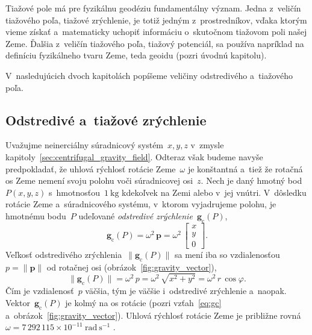 \documentclass[a4paper, 12pt]{book}
\newcommand{\cidx}{\mathrm c}
\let\vec\mathbf
\begin{document}
Tiažové pole má pre fyzikálnu geodéziu fundamentálny význam.  Jedna z~veličín 
tiažového poľa, tiažové zrýchlenie, je totiž jedným z~prostredníkov, vďaka 
ktorým vieme získať a~matematicky uchopiť informáciu o~skutočnom tiažovom poli 
našej Zeme.  Ďalšia z~veličín tiažového poľa, tiažový potenciál, sa používa 
napríklad na definíciu fyzikálneho tvaru Zeme, teda geoidu (pozri úvodnú 
kapitolu).

V~nasledujúcich dvoch kapitolách popíšeme veličiny odstredivého a~tiažového 
poľa.






\subsection{Odstredivé a~tiažové zrýchlenie}
\label{sec:centrifugal_and_gravity_acceleration}

Uvažujme neinerciálny súradnicový systém~$x, y, z$ v~zmysle 
kapitoly~\ref{sec:centrifugal_gravity_field}.  Odteraz však budeme navyše 
predpokladať, že uhlová rýchlosť rotácie Zeme~$\omega$ je konštantná a~tiež že 
rotačná os Zeme nemení svoju polohu voči súradnicovej osi~$z$.  Nech je daný 
hmotný bod~$P(x, y, z)$ s~hmotnosťou~$1\ \mathrm{kg}$ kdekoľvek na Zemi alebo 
v~jej vnútri.  V~dôsledku rotácie Zeme a~súradnicového systému, v~ktorom 
vyjadrujeme polohu, je hmotnému bodu~$P$ udeľované \emph{odstredivé 
zrýchlenie}~$\vec g_\cidx(P)$,
%
\begin{equation}
\label{eq:gc}
\vec g_\cidx(P) = \omega^2 \, \vec p =
%
\omega^2 \, \begin{bmatrix}
x\\
y\\
0
\end{bmatrix}
%
{.}
\end{equation}
%
Veľkosť odstredivého zrýchlenia~$\| \vec g_\cidx(P) \|$ sa mení iba so 
vzdialenosťou~$p = \| \vec p \|$ od rotačnej osi 
(obrázok~\ref{fig:gravity_vector}),
%
\begin{equation}
\label{eq:gc_magnitude}
\| \vec g_\cidx(P) \| = \omega^2 \, p = \omega^2 \, \sqrt{x^2 + y^2} = \omega^2 
\, r \, \cos\varphi{.}
\end{equation}
%
Čím je vzdialenosť~$p$ väčšia, tým je väčšie i~odstredivé zrýchlenie a~naopak.  
Vektor~$\vec g_\cidx(P)$ je kolmý na os rotácie (pozri vzťah~\ref{eq:gc} 
a~obrázok~\ref{fig:gravity_vector}).  Uhlová rýchlosť rotácie Zeme je približne 
rovná~$\omega = 7\, 292\, 115 \times 10^{-11} \ \mathrm{rad} \ \mathrm{s}^{-1}$ 
\parencite{GRS80}{.}
\end{document}
